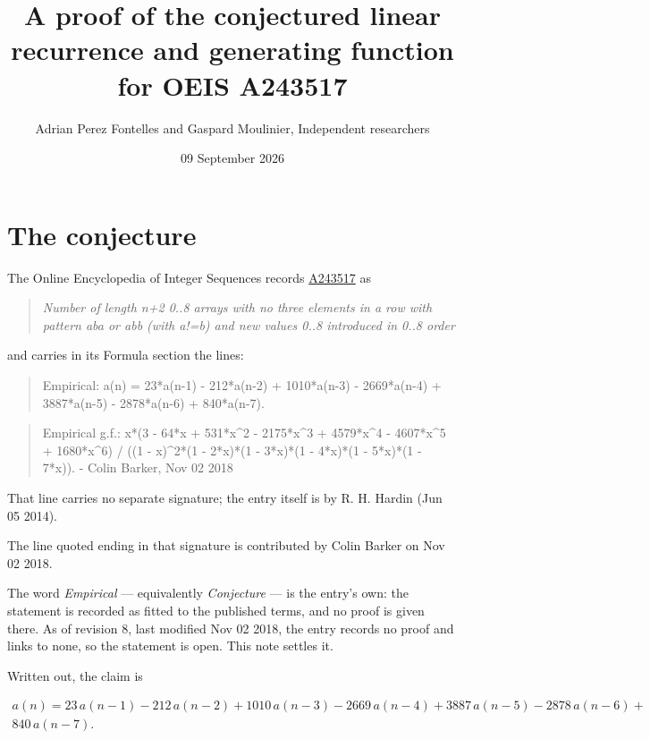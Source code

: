 \documentclass[11pt]{article}
\title{A proof of the conjectured linear recurrence and generating function for OEIS A243517}
\author{Adrian Perez Fontelles and Gaspard Moulinier, Independent researchers}
\date{09 September 2026}
\theoremstyle{definition}
\begin{document}
\maketitle
\section{The conjecture}

The Online Encyclopedia of Integer Sequences records \href{https://oeis.org/A243517}{A243517} as

\begin{quote}\itshape Number of length n+2 0..8 arrays with no three elements in a row with pattern aba or abb (with a!=b) and new values 0..8 introduced in 0..8 order\end{quote}

and carries in its Formula section the lines:

\begin{quote}\ttfamily Empirical: a(n) = 23*a(n-1) - 212*a(n-2) + 1010*a(n-3) - 2669*a(n-4) + 3887*a(n-5) - 2878*a(n-6) + 840*a(n-7).\end{quote}

\begin{quote}\ttfamily Empirical g.f.: x*(3 - 64*x + 531*x\textasciicircum{}2 - 2175*x\textasciicircum{}3 + 4579*x\textasciicircum{}4 - 4607*x\textasciicircum{}5 + 1680*x\textasciicircum{}6) / ((1 - x)\textasciicircum{}2*(1 - 2*x)*(1 - 3*x)*(1 - 4*x)*(1 - 5*x)*(1 - 7*x)). - Colin Barker, Nov 02 2018\end{quote}

That line carries no separate signature; the entry itself is by R. H. Hardin (Jun 05 2014).

The line quoted ending in that signature is contributed by Colin Barker on Nov 02 2018.

The word {\itshape Empirical} --- equivalently {\itshape Conjecture} --- is the entry's own: the statement is recorded as fitted to the published terms, and no proof is given there. As of revision 8, last modified Nov 02 2018, the entry records no proof and links to none, so the statement is open. This note settles it.

Written out, the claim is

\begin{multline*} a(n) = 23\,a(n-1) - 212\,a(n-2) + 1010\,a(n-3) - 2669\,a(n-4) + 3887\,a(n-5) - 2878\,a(n-6) + \\ 840\,a(n-7). \end{multline*}
\end{document}
